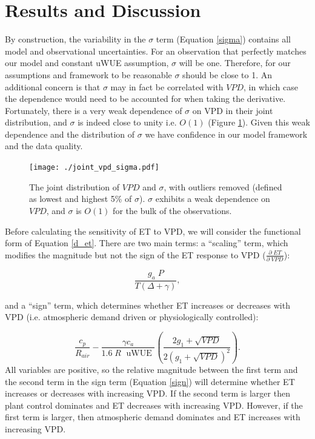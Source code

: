 \documentclass[draft,linenumbers]{afmjournal}
\begin{document}
\section{Results and Discussion}
\label{results}

By construction, the variability in the $\sigma$ term (Equation
\ref{sigma}) contains all model and observational uncertainties. For
an observation that perfectly matches our model and constant uWUE
assumption, $\sigma$ will be one. Therefore, for our assumptions and
framework to be reasonable $\sigma$ should be close to 1. An
additional concern is that $\sigma$ may in fact be correlated with
$VPD$, in which case the dependence would need to be accounted for
when taking the derivative. Fortunately, there is a very weak
dependence of $\sigma$ on VPD in their joint distribution, and
$\sigma$ is indeed close to unity i.e. $O(1)$ (Figure
\ref{joint_vpd_sigma}). Given this weak dependence and the
distribution of $\sigma$ we have confidence in our model framework and
the data quality.

\begin{figure}
  \centering \texttt{[image: ./joint\_vpd\_sigma.pdf]}
  \caption{The joint distribution of $VPD$ and $\sigma$, with outliers
    removed (defined as lowest and highest 5\% of $\sigma$). $\sigma$
    exhibits a weak dependence on $VPD$, and $\sigma$ is $O(1)$ for
    the bulk of the observations.}
  \label{joint_vpd_sigma}
\end{figure}

Before calculating the sensitivity of ET to VPD, we will consider the
functional form of Equation \ref{d_et}. There are two main terms: a
``scaling'' term, which modifies the magnitude but not the sign of the
ET response to VPD ($\frac{\partial \; ET}{\partial \; VPD}$):

\begin{equation}
  \frac{g_a \; P}{T(\Delta + \gamma)},
\end{equation}

and a ``sign'' term, which determines whether ET increases or
decreases with VPD (i.e. atmospheric demand driven or physiologically
controlled):

\begin{equation}
  \label{sign}
  \frac{c_p}{R_{air}} - \frac{\gamma c_a }{1.6 \; R\; \text{ uWUE }} \left( \frac{2 g_1 + \sqrt{VPD}}{2 (g_1 + \sqrt{VPD})^2}\right).
\end{equation}
All variables are positive, so the relative magnitude between the
first term and the second term in the sign term (Equation \ref{sign})
will determine whether ET increases or decreases with increasing
VPD. If the second term is larger then plant control dominates and ET
decreases with increasing VPD. However, if the first term is larger,
then atmospheric demand dominates and ET increases with increasing
VPD.
\end{document}
